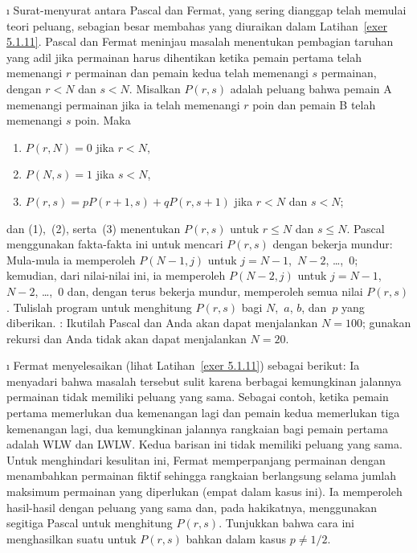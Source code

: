 \begin{LJSItem}
\i\label{exer 5.1.12} Surat-menyurat antara Pascal dan Fermat, yang
sering dianggap telah memulai teori peluang, sebagian besar membahas  yang diuraikan dalam Latihan~\ref{exer 5.1.11}.  Pascal dan Fermat meninjau masalah
menentukan pembagian taruhan yang adil jika permainan harus dihentikan ketika pemain pertama telah memenangi
$r$ permainan dan pemain kedua telah memenangi $s$ permainan, dengan $r < N$ dan $s < N$.  Misalkan $P(r,s)$ adalah
peluang bahwa pemain A memenangi permainan jika ia telah memenangi $r$ poin dan pemain B telah memenangi
$s$ poin.  Maka
\begin{enumerate}
\item $P(r,N) = 0$ jika $r < N$,
\item $P(N,s) = 1$ jika $s < N$,
\item $P(r,s) = pP(r + 1,s) + qP(r,s + 1)$ jika $r < N$ dan $s < N$;
\end{enumerate} dan (1),~(2), serta~(3) menentukan $P(r,s)$ untuk $r \leq N$ dan $s \leq N$.  Pascal
menggunakan fakta-fakta ini untuk mencari $P(r,s)$ dengan bekerja mundur: Mula-mula ia memperoleh $P(N - 1,j)$ untuk $j =
N - 1$,~$N - 2$, \dots,~0; kemudian, dari nilai-nilai ini, ia memperoleh
$P(N - 2,j)$ untuk $j = N - 1$,~$N - 2$, \dots,~0 dan, dengan terus bekerja mundur, memperoleh semua
nilai $P(r,s)$.  Tulislah program untuk menghitung $P(r,s)$ bagi $N$,~$a$, $b$, dan~$p$ yang diberikan.  : Ikutilah Pascal dan Anda akan dapat menjalankan $N = 100$; gunakan rekursi dan Anda
tidak akan dapat menjalankan $N = 20$.

\i\label{exer 5.1.13} Fermat menyelesaikan  (lihat Latihan~\ref{exer
5.1.11}) sebagai berikut: Ia menyadari bahwa masalah tersebut sulit karena berbagai kemungkinan jalannya
permainan tidak memiliki peluang yang sama.  Sebagai contoh, ketika pemain pertama memerlukan dua kemenangan lagi
dan pemain kedua memerlukan tiga kemenangan lagi, dua kemungkinan jalannya rangkaian bagi pemain pertama
adalah WLW dan LWLW.  Kedua barisan ini tidak memiliki peluang yang sama.  Untuk menghindari kesulitan ini, Fermat
memperpanjang permainan dengan menambahkan permainan fiktif sehingga rangkaian berlangsung selama jumlah maksimum permainan yang
diperlukan (empat dalam kasus ini).  Ia memperoleh hasil-hasil dengan peluang yang sama dan, pada hakikatnya, menggunakan
segitiga Pascal untuk menghitung $P(r,s)$.  Tunjukkan bahwa cara ini menghasilkan suatu  untuk $P(r,s)$
bahkan dalam kasus $p \ne 1/2$.


\end{LJSItem}
